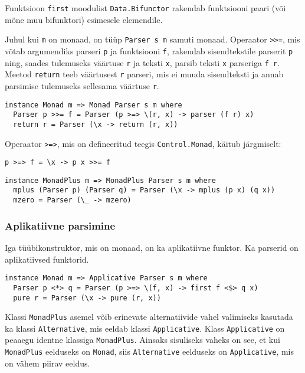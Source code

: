 \documentclass[12pt]{article}
\begin{document}
        Funktsioon \verb!first! moodulist \verb!Data.Bifunctor! rakendab funktsiooni paari (või mõne muu bifunktori) esimesele elemendile.

        Juhul kui \verb!m! on monaad, on tüüp \verb!Parser s m! samuti monaad. Operaator \verb!>>=!, mis võtab argumendiks parseri \verb!p! ja funktsiooni \verb!f!, rakendab sisendtekstile parserit \verb!p! ning, saades tulemuseks väärtuse \verb!r! ja teksti \verb!x!, parsib teksti \verb!x! parseriga \verb!f r!. Meetod \verb!return! teeb väärtusest \verb!r! parseri, mis ei muuda sisendteksti ja annab parsimise tulemuseks sellesama väärtuse \verb!r!.

        \begin{verbatim}instance Monad m => Monad Parser s m where
  Parser p >>= f = Parser (p >=> \(r, x) -> parser (f r) x)
  return r = Parser (\x -> return (r, x))\end{verbatim}

        Operaator \verb!>=>!, mis on defineeritud teegis \verb!Control.Monad!, käitub järgmiselt:

        \begin{verbatim}p >=> f = \x -> p x >>= f\end{verbatim}

        \begin{verbatim}instance MonadPlus m => MonadPlus Parser s m where
  mplus (Parser p) (Parser q) = Parser (\x -> mplus (p x) (q x))
  mzero = Parser (\_ -> mzero)\end{verbatim}
      \subsubsection{Aplikatiivne parsimine}\label{appars}
        Iga tüübikonstruktor, mis on monaad, on ka aplikatiivne funktor. Ka parserid on aplikatiivsed funktorid.

        \begin{verbatim}instance Monad m => Applicative Parser s m where
  Parser p <*> q = Parser (p >=> \(f, x) -> first f <$> q x)
  pure r = Parser (\x -> pure (r, x))\end{verbatim}

        Klassi \verb!MonadPlus! asemel võib erinevate alternatiivide vahel valimiseks kasutada ka klassi \verb!Alternative!, mis eeldab klassi \verb!Applicative!. Klass \verb!Applicative! on peaaegu identne klassiga \verb!MonadPlus!. Ainsaks sisuliseks vaheks on see, et kui \verb!MonadPlus! eelduseks on \verb!Monad!, siis \verb!Alternative! eelduseks on \verb!Applicative!, mis on vähem piirav eeldus.
\end{document}
